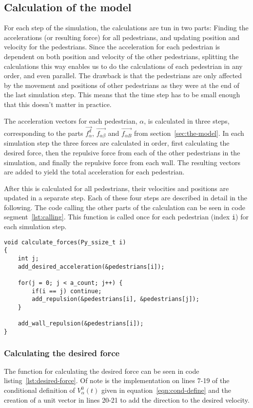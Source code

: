 \subsection{Calculation of the model}
\label{sec:model-calculation}
For each step of the simulation, the calculations are tun in two parts: 
Finding the accelerations (or resulting force) for all pedestrians, and updating 
position and velocity for the pedestrians.  Since the acceleration for each pedestrian 
is dependent on both position and velocity of the other pedestrians, splitting the 
calculations this way enables us to do the calculations of each pedestrian in any 
order, and even parallel. The drawback is that the pedestrians are only affected by 
the movement and positions of other pedestrians as they were at the end of the last 
simulation step. This means that the time step has to be small enough that 
this doesn't matter in practice.

The acceleration vectors for each pedestrian, $\alpha$, is calculated in three 
steps, corresponding to the parts $\overrightarrow{f_\alpha^d}$, 
$\overrightarrow{f_{\alpha \beta}}$ and $\overrightarrow{f_{\alpha B}}$ from 
section~\ref{sec:the-model}. In each simulation step the three forces are 
calculated in order, first calculating the desired force, then the repulsive 
force from each of the other pedestrians in the simulation, and finally the 
repulsive force from each wall. The resulting vectors are added to yield the 
total acceleration for each pedestrian.

After this is calculated for all pedestrians, their velocities and positions are 
updated in a separate step. Each of these four steps are described in detail 
in the following. The code calling the other parts of the calculation can be 
seen in code segment~\ref{lst:calling}. This function is called once for each 
pedestrian (index \texttt{i}) for each simulation step.

\begin{lstlisting}[caption={Main function calling the other parts of the 
    calculation code.},label=lst:calling]
void calculate_forces(Py_ssize_t i)
{
    int j;
    add_desired_acceleration(&pedestrians[i]);

    for(j = 0; j < a_count; j++) {
        if(i == j) continue;
        add_repulsion(&pedestrians[i], &pedestrians[j]);
    }

    add_wall_repulsion(&pedestrians[i]);
}
\end{lstlisting}

\subsubsection{Calculating the desired force}
The function for calculating the desired force can be seen in code 
listing~\ref{lst:desired-force}. Of note is the implementation on lines 7-19 
of the conditional definition of $V_\alpha^0(t)$ given in 
equation~\eqref{eqn:cond-define} and the creation of a unit vector in lines 
20-21 to add the direction to the desired velocity.

